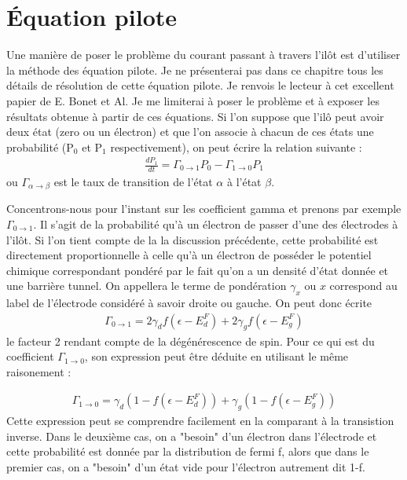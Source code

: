 \section{\'Equation pilote}
Une manière de poser le problème du courant passant à travers l'il\^ot est d'utiliser la méthode des équation pilote. Je ne présenterai pas dans ce chapitre tous les détails de résolution de cette équation pilote. Je renvois le lecteur à cet excellent papier de E. Bonet et Al. Je me limiterai à poser le problème et à exposer les résultats obtenue à partir de ces équations.
Si l'on suppose que l'il\^o peut avoir deux état (zero ou un électron) et que l'on associe à chacun de ces états une probabilité (P$_0$ et P$_1$ respectivement), on peut écrire la relation suivante :
\begin{eqnarray}
\frac{dP_1}{dt} = \Gamma_{0 \rightarrow 1}P_0 - \Gamma_{1 \rightarrow 0}P_1
\end{eqnarray}
ou $\Gamma_{\alpha \rightarrow \beta}$ est le taux de transition de l'état $\alpha$ à l'état $\beta$.

Concentrons-nous pour l'instant sur les coefficient gamma et prenons par exemple $\Gamma_{0 \rightarrow 1}$. Il s'agit de la probabilité qu'à un électron de passer d'une des électrodes à l'il\^ot. Si l'on tient compte de la la discussion précédente, cette probabilité est directement proportionnelle à celle qu'à un électron de posséder le potentiel chimique correspondant pondéré par le fait qu'on a un densité d'état donnée et une barrière tunnel. On appellera le terme de pondération $\gamma_x$ ou $x$ correspond au label de l'électrode considéré à savoir droite ou gauche. On peut donc écrite 
\begin{eqnarray}
\Gamma_{0 \rightarrow 1} = 2\gamma_d  f(\epsilon - E_d^F) + 2\gamma_g f(\epsilon - E_g^F)
\end{eqnarray}
le facteur 2 rendant compte de la dégénérescence de spin. Pour ce qui est du coefficient $\Gamma_{1 \rightarrow 0}$, son expression peut être déduite en utilisant le même raisonement :

\begin{eqnarray}
\Gamma_{1 \rightarrow 0} = \gamma_d (1- f(\epsilon - E_d^F)) + \gamma_g (1-f(\epsilon - E_g^F))
\end{eqnarray}
Cette expression peut se comprendre facilement en la comparant à la transistion inverse. Dans le deuxième cas, on a "besoin" d'un électron dans l'électrode et cette probabilité est donnée par la distribution de fermi f, alors que dans le premier cas, on a "besoin" d'un état vide pour l'électron autrement dit 1-f.

